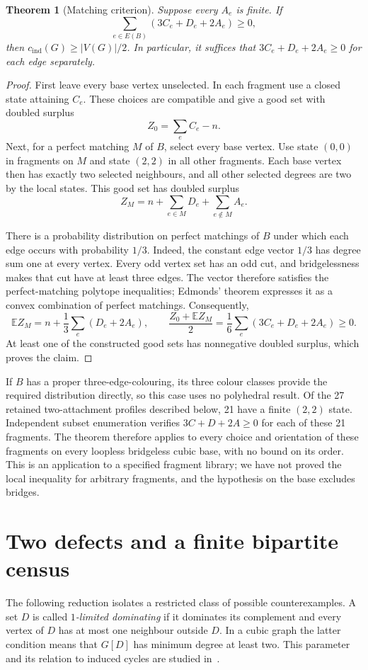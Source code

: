 \documentclass[11pt]{article}
\newtheorem{theorem}{Theorem}[section]
\newcommand{\cind}{c_{\mathrm{ind}}}
\begin{document}
\begin{theorem}[Matching criterion]\label{thm:matching-criterion}
Suppose every $A_e$ is finite. If
\begin{equation}\label{eq:local-criterion}
 \sum_{e\in E(B)}(3C_e+D_e+2A_e)\geq0,
\end{equation}
then $\cind(G)\geq |V(G)|/2$. In particular, it suffices that
$3C_e+D_e+2A_e\geq0$ for each edge separately.
\end{theorem}
\begin{proof}
First leave every base vertex unselected. In each fragment use
a closed state attaining $C_e$. These choices are compatible and
give a good set with doubled surplus
\[
 Z_0=\sum_e C_e-n.
\]
Next, for a perfect matching $M$ of $B$, select every base vertex.
Use state $(0,0)$ in fragments on $M$ and state $(2,2)$ in all
other fragments. Each base vertex then has exactly two selected
neighbours, and all other selected degrees are two by the local
states. This good set has doubled surplus
\[
 Z_M=n+\sum_{e\in M}D_e+\sum_{e\notin M}A_e.
\]

There is a probability distribution on perfect matchings of $B$
under which each edge occurs with probability $1/3$. Indeed, the
constant edge vector $1/3$ has degree sum one at every vertex.
Every odd vertex set has an odd cut, and bridgelessness makes that
cut have at least three edges. The vector therefore satisfies the
perfect-matching polytope inequalities; Edmonds' theorem
\cite{Edmonds} expresses it as a convex combination of perfect
matchings. Consequently,
\[
 \mathbb E Z_M=n+\frac13\sum_e(D_e+2A_e),\qquad
 \frac{Z_0+\mathbb E Z_M}{2}
 =\frac16\sum_e(3C_e+D_e+2A_e)\geq0.
\]
At least one of the constructed good sets has nonnegative doubled
surplus, which proves the claim.
\end{proof}

If $B$ has a proper three-edge-colouring, its three colour classes
provide the required distribution directly, so this case uses no
polyhedral result. Of the 27 retained two-attachment profiles
described below, 21 have a finite $(2,2)$ state. Independent subset
enumeration verifies $3C+D+2A\geq0$ for each of these 21 fragments.
The theorem therefore applies to every choice and orientation of
these fragments on every loopless bridgeless cubic base, with no
bound on its order. This is an application to a specified fragment
library; we have not proved the local inequality for arbitrary
fragments, and the hypothesis on the base excludes bridges.

\section{Two defects and a finite bipartite census}
The following reduction isolates a restricted class of possible
counterexamples. A set $D$ is called \emph{$1$-limited dominating}
if it dominates its complement and every vertex of $D$ has at most
one neighbour outside $D$. In a cubic graph the latter condition
means that $G[D]$ has minimum degree at least two. This parameter and its relation
to induced cycles are studied in~\cite{RRT}.
\end{document}
